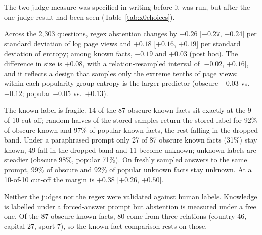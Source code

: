 The two-judge measure was specified in writing before it was run, but after the one-judge result had been seen (Table~\ref{tab:x0choices}).

Across the 2,303 questions, regex abstention changes by $-0.26$ [$-0.27$, $-0.24$] per standard deviation of log page views and $+0.18$ [$+0.16$, $+0.19$] per standard deviation of entropy; among known facts, $-0.19$ and $+0.03$ (post hoc). The difference in size is $+0.08$, with a relation-resampled interval of [$-0.02$, $+0.16$], and it reflects a design that samples only the extreme tenths of page views: within each popularity group entropy is the larger predictor (obscure $-0.03$ vs.\ $+0.12$; popular $-0.05$ vs.\ $+0.13$).


The known label is fragile. 14 of the 87 obscure known facts sit exactly at the 9-of-10 cut-off; random halves of the stored samples return the stored label for 92\% of obscure known and 97\% of popular known facts, the rest falling in the dropped band. Under a paraphrased prompt only 27 of 87 obscure known facts (31\%) stay known, 49 fall in the dropped band and 11 become unknown; unknown labels are steadier (obscure 98\%, popular 71\%). On freshly sampled answers to the same prompt, 99\% of obscure and 92\% of popular unknown facts stay unknown. At a 10-of-10 cut-off the margin is $+0.38$ [$+0.26$, $+0.50$].

Neither the judges nor the regex were validated against human labels. Knowledge is labelled under a forced-answer prompt but abstention is measured under a free one. Of the 87 obscure known facts, 80 come from three relations (country 46, capital 27, sport 7), so the known-fact comparison rests on those.

